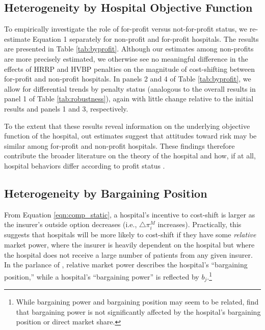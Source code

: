 \documentclass[12pt]{article}
\begin{document}
\subsection{Heterogeneity by Hospital Objective Function}
To empirically investigate the role of for-profit versus not-for-profit status, we re-estimate Equation 1 separately for non-profit and for-profit hospitals.  The results are presented in Table \ref{tab:byprofit}. Although our estimates among non-profits are more precisely estimated, we otherwise see no meaningful difference in the effects of HRRP and HVBP penalties on the magnitude of cost-shifting between for-profit and non-profit hospitals. In panels 2 and 4 of Table \ref{tab:byprofit}, we allow for differential trends by penalty status (analogous to the overall results in panel 1 of Table \ref{tab:robustness}), again with little change relative to the initial results and panels 1 and 3, respectively.

To the extent that these results reveal information on the underlying objective function of the hospital, out estimates suggest that attitudes toward risk may be similar among for-profit and non-profit hospitals. These findings therefore contribute the broader literature on the theory of the hospital and how, if at all, hospital behaviors differ according to profit status \citep{sloan2001,duggan2002,horwitz2005,horwitz2009,david2009}.

\subsection{Heterogeneity by Bargaining Position}
From Equation \ref{eqn:comp_static}, a hospital's incentive to cost-shift is larger as the insurer's outside option decreases (i.e., $\triangle \pi_{i}^{M}$ increases). Practically, this suggests that hospitals will be more likely to cost-shift if they have some \textit{relative} market power, where the insurer is heavily dependent on the hospital but where the hospital does not receive a large number of patients from any given insurer. In the parlance of \cite{lewis2015}, relative market power describes the hospital's ``bargaining position,'' while a hospital's ``bargaining power'' is reflected by $b_{j}$.\footnote{While bargaining power and bargaining position may seem to be related, \cite{lewis2015} find that bargaining power is not significantly affected by the hospital's bargaining position or direct market share.}
\end{document}
